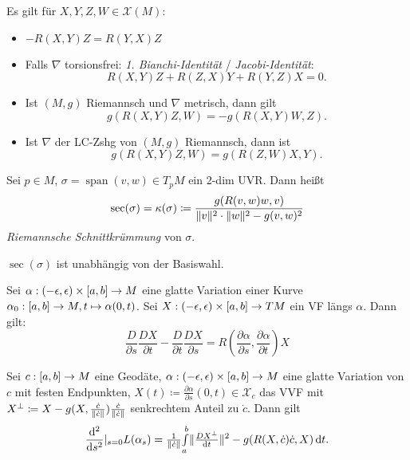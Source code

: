 \documentclass{cheat-sheet}
\newcommand{\vinterval}{\ointerval{-\epsilon}{\epsilon}} %
\DeclareMathOperator{\Span}{span} %
\newcommand{\abinterval}{\cinterval{a}{b}} %
\newcommand{\VF}{\mathcal{X}} %
\begin{document}
\begin{satz}
  Es gilt für $X,Y,Z,W \in \VF(M)$:
  \begin{itemize}
    \item $- R(X, Y)Z = R(Y, X)Z$
    \item Falls $\nabla$ torsionsfrei: \emph{1. Bianchi-Identität} / \emph{Jacobi-Identität}:
    \[ R(X,Y)Z + R(Z,X)Y + R(Y,Z)X = 0. \]
    \item Ist $(M, g)$ Riemannsch und $\nabla$ metrisch, dann gilt
    \[ g(R(X,Y)Z, W) = -g(R(X,Y)W, Z). \]
    \item Ist $\nabla$ der LC-Zshg von $(M, g)$ Riemannsch, dann ist
    \[ g(R(X, Y)Z, W) = g(R(Z,W)X,Y). \]
  \end{itemize}
\end{satz}


\begin{defn}
  Sei $p \in M$, $\sigma = \Span(v,w) \in T_p M$ ein 2-dim UVR. Dann heißt
  \[ \sec(\sigma) = \kappa(\sigma) \coloneqq \frac{g(R(v,w)w,v)}{\lVert v\rVert^2 \cdot \lVert w\rVert^2 - g(v,w)^2} \]
  \emph{Riemannsche Schnittkrümmung} von $\sigma$.
\end{defn}

\begin{lem}
  $\sec(\sigma)$ ist unabhängig von der Basiswahl.
\end{lem}


\begin{satz}
  Sei $\alpha : \vinterval \times \abinterval \to M$ eine glatte Variation einer Kurve $\alpha_0 : \abinterval \to M, t \mapsto \alpha(0, t)$.
  Sei $X : \vinterval \times \abinterval \to TM$ ein VF längs $\alpha$. Dann gilt:
  \[
    \frac{D}{\partial s} \frac{DX}{\partial t} - \frac{D}{\partial t} \frac{DX}{\partial s} = R\left(\frac{\partial \alpha}{\partial s}, \frac{\partial \alpha}{\partial t}\right) X
  \]
\end{satz}

\begin{satz}
  Sei $c: \abinterval \to M$ eine Geodäte, $\alpha : \vinterval \times \abinterval \to M$ eine glatte Variation von $c$ mit festen Endpunkten, $X(t) \coloneqq \tfrac{\partial \alpha}{\partial s}(0, t) \in \VF_c$ das VVF mit $X^\perp \coloneqq X - g(X, \tfrac{\dot{c}}{\lVert\dot{c}\rVert}) \tfrac{\dot{c}}{\lVert\dot{c}\rVert}$ senkrechtem Anteil zu $\dot{c}$. Dann gilt
  \[
    \frac{\mathrm{d}^2}{\mathrm{d} s^2} |_{s=0} L(\alpha_s) = \tfrac{1}{\lVert\dot{c}\rVert} {\textstyle \int\limits_{a}^{b}} \lVert\tfrac{D X^\perp}{\mathrm{d} t}\rVert^2 - g(R(X,\dot{c})\dot{c},X) \,\mathrm{d} t.
  \]
\end{satz}
\end{document}
